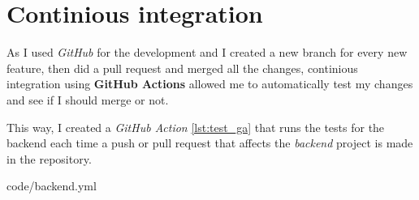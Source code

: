 \section{Continious integration}
As I used \textit{GitHub} for the development and I created a new branch for every new feature, then did a pull request and merged all the changes, continious integration using \textbf{GitHub Actions} allowed me to 
automatically test my changes and see if I should merge or not. 

This way, I created a \textit{GitHub Action} \ref{lst:test_ga} that runs the tests for the backend each time a push or pull request that affects the \textit{backend} project is made in the repository.

{code/backend.yml}